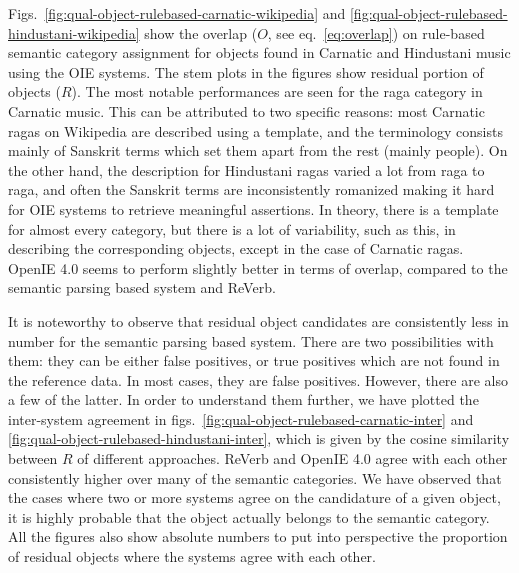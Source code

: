 \documentclass{llncs}
\begin{document}
Figs.~\ref{fig:qual-object-rulebased-carnatic-wikipedia} and \ref{fig:qual-object-rulebased-hindustani-wikipedia} show the overlap ($O$, see eq.~\ref{eq:overlap}) on rule-based semantic category assignment for objects found in Carnatic and Hindustani music using the OIE systems. The stem plots in the figures show residual portion of objects ($R$). The most notable performances are seen for the raga category in Carnatic music. This can be attributed to two specific reasons: most Carnatic ragas on Wikipedia are described using a template, and the terminology consists mainly of Sanskrit terms which set them apart from the rest (mainly people). On the other hand, the description for Hindustani ragas varied a lot from raga to raga, and often the Sanskrit terms are inconsistently romanized making it hard for OIE systems to retrieve meaningful assertions. In theory, there is a template for almost every category, but there is a lot of variability, such as this, in describing the corresponding objects, except in the case of Carnatic ragas. OpenIE 4.0 seems to perform slightly better in terms of overlap, compared to the semantic parsing based system and ReVerb. 

It is noteworthy to observe that residual object candidates are consistently less in number for the semantic parsing based system. There are two possibilities with them: they can be either false positives, or true positives which are not found in the reference data. In most cases, they are false positives. However, there are also a few of the latter. In order to understand them further, we have plotted the inter-system agreement in figs.~\ref{fig:qual-object-rulebased-carnatic-inter} and \ref{fig:qual-object-rulebased-hindustani-inter}, which is given by the cosine similarity between $R$ of different approaches. ReVerb and OpenIE 4.0 agree with each other consistently higher over many of the semantic categories. We have observed that the cases where two or more systems agree on the candidature of a given object, it is highly probable that the object actually belongs to the semantic category. All the figures also show absolute numbers to put into perspective the proportion of residual objects where the systems agree with each other.
\end{document}
